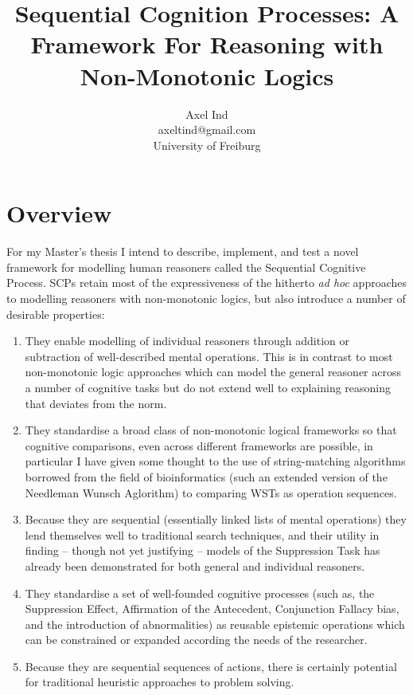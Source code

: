 \documentclass{article}
\begin{document}
\title{Sequential Cognition Processes: A Framework For Reasoning with Non-Monotonic Logics}
\author{Axel Ind \\ axeltind@gmail.com \\ University of Freiburg}

\maketitle

\section{Overview}
For my Master's thesis I intend to describe, implement, and test a novel framework for modelling human reasoners called the Sequential Cognitive Process. SCPs retain most of the expressiveness of the hitherto \textit{ad hoc} approaches to modelling reasoners with non-monotonic logics, but also introduce a number of desirable properties:
\begin{enumerate}
\item They enable modelling of individual reasoners through addition or subtraction of well-described mental operations. This is in contrast to most non-monotonic logic approaches which can model the general reasoner across a number of cognitive tasks but do not extend well to explaining reasoning that deviates from the norm.
\item They standardise a broad class of non-monotonic logical frameworks so that cognitive comparisons, even across different frameworks are possible, in particular I have given some thought to the use of string-matching algorithms borrowed from the field of bioinformatics (such an extended version of the Needleman Wunsch Aglorithm\cite{needleman1970general}) to comparing WSTs as operation sequences.
\item Because they are sequential (essentially linked lists of mental operations) they lend themselves well to traditional search techniques, and their utility in finding -- though not yet justifying -- models of the Suppression Task has already been demonstrated for both general and individual reasoners.
\item They standardise a set of well-founded cognitive processes (such as, the Suppression Effect, Affirmation of the Antecedent, Conjunction Fallacy bias, and the introduction of abnormalities) as reusable epistemic operations which can be constrained or expanded according the needs of the researcher.
\item Because they are sequential sequences of actions, there is certainly potential for traditional heuristic approaches to problem solving.
\end{enumerate}
\end{document}
